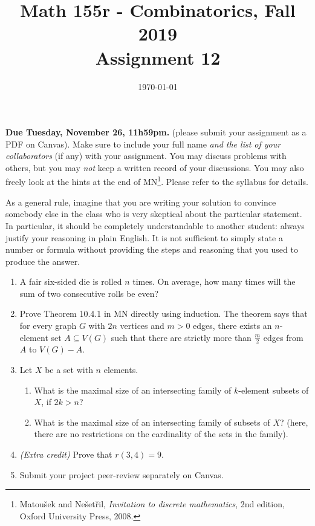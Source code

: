 \documentclass{amsart}
\title[Math 155r, Fall 2019: assignment 12]{Math 155r - Combinatorics, Fall 2019 \\ Assignment 12}
\date{\today}
\theoremstyle{definition}
\begin{document}

\vspace*{-10em}
\maketitle

\textbf{Due Tuesday, November 26, 11h59pm.} (please submit your assignment as a PDF on Canvas). Make sure to include your full name \emph{and the list of your collaborators} (if any) with your assignment. You may discuss problems with others, but you may \emph{not} keep a written record of your discussions. You may also freely look at the hints at the end of MN\footnote{Matoušek and Nešetřil, \emph{Invitation to discrete mathematics}, 2nd edition, Oxford University Press, 2008.}. Please refer to the syllabus for details.

As a general rule, imagine that you are writing your solution to convince somebody else in the class who is very skeptical about the particular statement. In particular, it should be completely understandable to another student: always justify your reasoning in plain English. It is not sufficient to simply state a number or formula without providing the steps and reasoning that you used to produce the answer.

\begin{enumerate}
\item A fair six-sided die is rolled $n$ times. On average, how many times will the sum of two consecutive rolls be even?
\item Prove Theorem 10.4.1 in MN directly using induction. The theorem says that for every graph $G$ with $2n$ vertices and $m > 0$ edges, there exists an $n$-element set $A \subseteq V (G)$ such that there are strictly more than $\frac{m}{2}$ edges from $A$ to $V (G) - A$.  
\item Let $X$ be a set with $n$ elements.
  \begin{enumerate}
  \item What is the maximal size of an intersecting family of $k$-element subsets of $X$, if $2k > n$?
  \item What is the maximal size of an intersecting family of subsets of $X$? (here, there are no restrictions on the cardinality of the sets in the family).
  \end{enumerate}

\item \emph{(Extra credit)} Prove that $r (3, 4) = 9$.
\item Submit your project peer-review separately on Canvas.

\end{enumerate}
\end{document}
